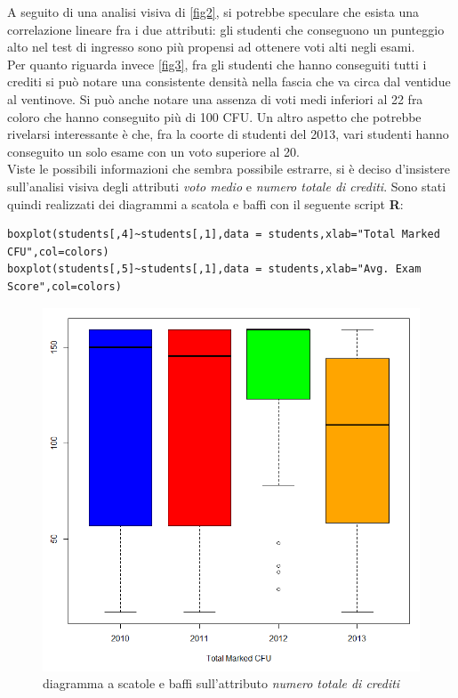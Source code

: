 A seguito di una analisi visiva di \ref{fig2}, si potrebbe speculare che esista una correlazione lineare fra i due attributi: gli studenti che conseguono un punteggio alto nel test di ingresso sono più propensi ad ottenere voti alti negli esami. \\

Per quanto riguarda invece \ref{fig3}, fra gli studenti che hanno conseguiti tutti i crediti si può notare una consistente densità nella fascia che va circa dal ventidue al ventinove. Si può anche notare una assenza di voti medi inferiori al 22 fra coloro che hanno conseguito più di 100 CFU. Un altro aspetto che potrebbe rivelarsi interessante è che, fra la coorte di studenti del 2013, vari studenti hanno conseguito un solo esame con un voto superiore al 20. \\

Viste le possibili informazioni che sembra possibile estrarre, si è deciso d'insistere sull’analisi visiva degli attributi \textit{voto medio} e \textit{numero totale di crediti}. Sono stati quindi realizzati dei diagrammi a scatola e baffi con il seguente script \textbf{R}: 

\begin{lstlisting}
boxplot(students[,4]~students[,1],data = students,xlab="Total Marked CFU",col=colors)
boxplot(students[,5]~students[,1],data = students,xlab="Avg. Exam Score",col=colors)
\end{lstlisting}

\begin{figure}
    \centering
    \caption{diagramma a scatole e baffi sull'attributo \textit{numero totale di crediti}}
    \label{boxplot1}
	\includegraphics[scale=0.5]{img/box_plot_1.png}
\end{figure}

